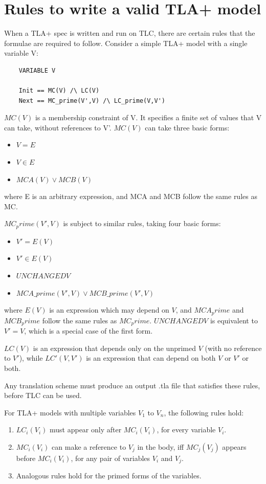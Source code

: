 \section{Rules to write a valid TLA+ model}

When a TLA+ spec is written and run on TLC, there are certain rules that the formulae are required to follow. Consider a simple TLA+ model with a single variable V:

\begin{lstlisting}
	VARIABLE V

	Init == MC(V) /\ LC(V)
	Next == MC_prime(V',V) /\ LC_prime(V,V')

\end{lstlisting}

$MC(V)$ is a membership constraint of V. It specifies a finite set of values that V can take, without references to V'. $MC(V)$ can take three basic forms:

\begin{itemize}
	\item $V = E$
	\item $V \in E$
	\item $MCA(V) \lor MCB(V)$
\end{itemize}

where E is an arbitrary expression, and MCA and MCB follow the same rules as MC.

$MC_prime(V',V)$ is subject to similar rules, taking four basic forms:

\begin{itemize}
	\item $V' = E(V)$
	\item $V' \in E(V)$
	\item $UNCHANGED V$
	\item $MCA\_prime(V',V) \lor MCB\_prime(V',V)$
\end{itemize}

where $E(V)$ is an expression which may depend on $V$, and $MCA_prime$ and $MCB_prime$ follow the same rules as $MC_prime$. $UNCHANGED V$ is equivalent to $V' = V$, which is a special case of the first form.

$LC(V)$ is an expression that depends only on the unprimed $V$ (with no reference to $V'$), while $LC'(V,V')$ is an expression that can depend on both $V$ or $V'$ or both.

Any translation scheme must produce an output .tla file that satisfies these rules, before TLC can be used.


For TLA+ models with multiple variables $V_1$ to $V_n$, the following rules hold:

\begin{enumerate}
	\item $LC_i(V_i)$ must appear only after $MC_i(V_i)$, for every variable $V_i$. 
	\item $MC_i(V_i)$ can make a reference to $V_j$ in the body, iff $MC_j(V_j)$ appears before $MC_i(V_i)$, for any pair of variables $V_i$ and $V_j$.
	\item Analogous rules hold for the primed forms of the variables.
\end{enumerate}